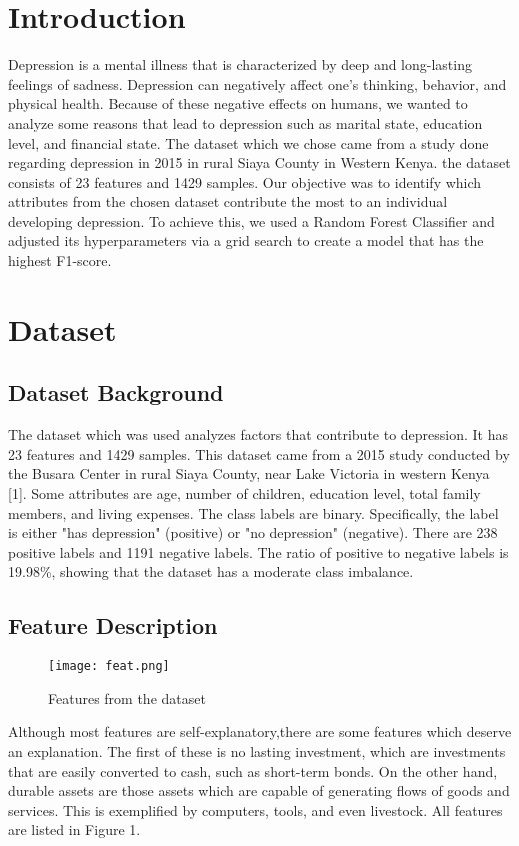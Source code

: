 \documentclass[conference]{IEEEtran}
\begin{document}
\section{Introduction}
Depression is a mental illness that is characterized by deep and long-lasting feelings of sadness. Depression can negatively affect one's thinking, behavior, and physical health. Because of these negative effects on humans, we wanted to analyze some reasons that lead to depression such as marital state, education level, and financial state. The dataset which we chose came from a study done regarding depression in 2015 in rural Siaya County in Western Kenya. the dataset consists of 23 features and 1429 samples. Our objective was to identify which attributes from the chosen dataset contribute the most to an individual developing depression. To achieve this, we used a Random Forest Classifier and adjusted its hyperparameters via a grid search to create a model that has the highest F1-score.



\section{Dataset}

\subsection{Dataset Background}
The dataset which was used analyzes factors that contribute to depression. It has 23 features and 1429 samples. This dataset came from a 2015 study conducted by the Busara Center in rural Siaya County, near Lake Victoria in western Kenya [1]. Some attributes are age, number of children, education level, total family members, and living expenses. The class labels are binary. Specifically, the label is either "has depression" (positive) or "no depression" (negative). There are 238 positive labels and 1191 negative labels. The ratio of positive to negative labels is 19.98\%, showing that the dataset has a moderate class imbalance.


\subsection{Feature Description}
\begin{figure}[hbt!]
\centering
\texttt{[image: feat.png]}
\caption{Features from the dataset\label{overflow}}
\end{figure}
Although most features are self-explanatory,there are some features which deserve an explanation. The first of these is no lasting investment, which are investments that are easily converted to cash, such as short-term bonds. On the other hand, durable assets are those assets which are capable of generating flows of goods and services. This is exemplified by computers, tools, and even livestock. All features are listed in Figure 1.
\end{document}
